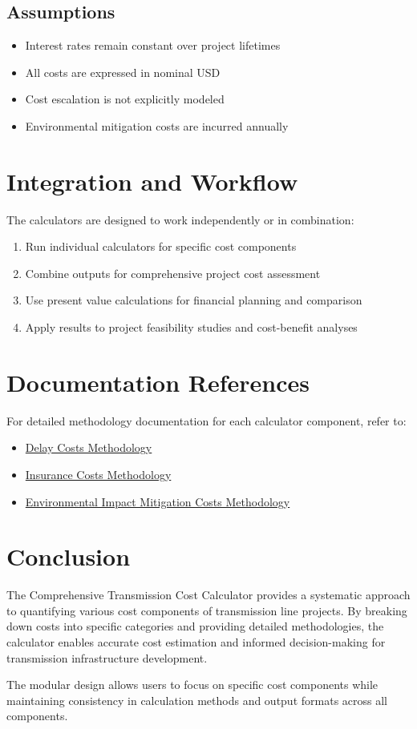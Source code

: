 \documentclass[12pt]{article}
\begin{document}
\subsection{Assumptions}
\begin{itemize}
    \item Interest rates remain constant over project lifetimes
    \item All costs are expressed in nominal USD
    \item Cost escalation is not explicitly modeled
    \item Environmental mitigation costs are incurred annually
\end{itemize}

\section{Integration and Workflow}

The calculators are designed to work independently or in combination:

\begin{enumerate}
    \item Run individual calculators for specific cost components
    \item Combine outputs for comprehensive project cost assessment
    \item Use present value calculations for financial planning and comparison
    \item Apply results to project feasibility studies and cost-benefit analyses
\end{enumerate}

\section{Documentation References}

For detailed methodology documentation for each calculator component, refer to:
\begin{itemize}
    \item \href{delaycosts_methodology.tex}{Delay Costs Methodology}
    \item \href{insurance_methodology.tex}{Insurance Costs Methodology}
    \item \href{environmental_impact_mitigation_methodology.tex}{Environmental Impact Mitigation Costs Methodology}
\end{itemize}

\section{Conclusion}

The Comprehensive Transmission Cost Calculator provides a systematic approach to quantifying various cost components of transmission line projects. By breaking down costs into specific categories and providing detailed methodologies, the calculator enables accurate cost estimation and informed decision-making for transmission infrastructure development.

The modular design allows users to focus on specific cost components while maintaining consistency in calculation methods and output formats across all components.
\end{document}
